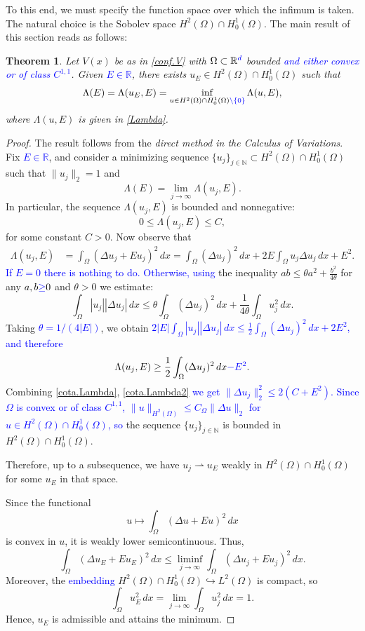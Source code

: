 \documentclass[10pt]{amsart}
\newcommand{\rev}[1]{\textcolor{blue}{#1}}
\theoremstyle{definition}
\theoremstyle{remark}
\theoremstyle{plain}
\newtheorem{theorem}{Theorem}
\newcommand{\R}{\mathbb{R}}
\newcommand{\N}{\mathbb{N}}
\begin{document}
To this end, we must specify the function space over which the infimum is taken. The natural choice is the Sobolev space $H^2(\Omega) \cap H^1_0(\Omega)$. The main result of this section reads as follows:

\begin{theorem}\label{teo.min}
Let $V(x)$ be as in \eqref{conf.V} with $\Omega\subset \R^{\rev{d}}$ bounded \rev{and either convex or of class $C^{1,1}$}. Given \rev{$E\in\R$}, there exists $u_E\in H^2(\Omega)\cap H^1_0(\Omega)$ such that
$$
\Lambda(E) = \Lambda(u_E, E) = \inf_{u\in H^2(\Omega)\cap H^1_0(\Omega)\rev{\setminus\{0\}}}\Lambda(u, E),
$$
where $\Lambda(u, E)$ is given in \eqref{Lambda}.
\end{theorem}

\begin{proof}
The result follows from the \emph{direct method in the Calculus of Variations}. Fix \rev{$E\in\R$}, and consider a minimizing sequence $\{u_j\}_{j \in \N} \subset H^2(\Omega) \cap H^1_0(\Omega)$ such that $\|u_j\|_2 = 1$ and
$$
\Lambda(E) = \lim_{j \to \infty} \Lambda(u_j, E).
$$
In particular, the sequence $\Lambda(u_j, E)$ is bounded and nonnegative:
\begin{equation}\label{cota.Lambda}
0 \le \Lambda(u_j, E) \le C,
\end{equation}
for some constant $C > 0$. Now observe that
\begin{align*}
\Lambda(u_j, E) &= \int_\Omega (\Delta u_j + Eu_j)^2\, dx = \int_\Omega (\Delta u_j)^2\, dx + 2E\int_\Omega u_j \Delta u_j \, dx+ E^2.
\end{align*}
\rev{If $E=0$ there is nothing to do. Otherwise, using} the inequality $ab\le \theta a^2 + \frac{b^2}{4\theta}$ for any $a, b\rev{\ge}0$ and $\theta >0$ we estimate:
$$
\int_\Omega |u_j| |\Delta u_j|\, dx \le \theta \int_\Omega (\Delta u_j)^2\, dx + \frac{1}{4\theta}\int_\Omega u_j^2\, dx.
$$
Taking \rev{$\theta=1/(4|E|)$}, we obtain \rev{$2|E|\int_\Omega|u_j||\Delta u_j|\,dx\le\frac12\int_\Omega(\Delta u_j)^2\,dx+2E^2$, and therefore}
\begin{equation}\label{cota.Lambda2}
\Lambda(u_j, E)\ge \frac12 \int_\Omega (\Delta u_j)^2\, dx \rev{-E^2}.
\end{equation}
Combining \eqref{cota.Lambda}, \eqref{cota.Lambda2} \rev{we get $\|\Delta u_j\|_2^2\le2(C+E^2)$. Since $\Omega$ is convex or of class $C^{1,1}$, $\|u\|_{H^2(\Omega)}\le C_\Omega\|\Delta u\|_2$ for $u\in H^2(\Omega)\cap H^1_0(\Omega)$, so} the sequence $\{u_j\}_{j\in\N}$ is bounded in $H^2(\Omega)\cap H^1_0(\Omega)$.

Therefore, up to a subsequence, we have $u_j \rightharpoonup u_E$ weakly in $H^2(\Omega) \cap H^1_0(\Omega)$ for some $u_E$ in that space.

Since the functional
$$
u \mapsto \int_\Omega (\Delta u + E u)^2\, dx
$$
is convex in $u$, it is weakly lower semicontinuous. Thus,
$$
\int_\Omega (\Delta u_E + E u_E)^2\, dx \le \liminf_{j \to \infty} \int_\Omega (\Delta u_j + E u_j)^2\, dx.
$$
Moreover, the \rev{embedding} $H^2(\Omega)\cap H^1_0(\Omega)\hookrightarrow L^2(\Omega)$ is compact, so
$$
\int_\Omega u_E^2\, dx = \lim_{j\to\infty} \int_\Omega u_j^2\, dx = 1.
$$
Hence, $u_E$ is admissible and attains the minimum.
\end{proof}
\end{document}
